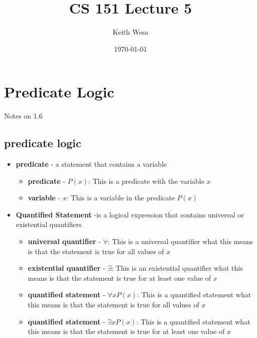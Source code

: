 \documentclass{article}
\author{Keith Wesa} %
\title{CS 151 Lecture 5} %
\date{\today} %
\begin{document}

\section{Predicate Logic}{Notes on 1.6}
\subsection{predicate logic}
\begin{itemize}
    \item[] \textbf{predicate} - a statement that contains a variable
    \begin{itemize}
        \item[] \textbf{predicate} - $P(x)$: This is a predicate with the variable $x$
        \item[] \textbf{variable} - $x$: This is a variable in the predicate $P(x)$
    \end{itemize}
    \item[] \textbf{Quantified Statement} -is a logical expression that contains universal or existential quantifiers 
    \begin{itemize}
        \item[] \textbf{universal quantifier} - $\forall$: This is a universal quantifier
        what this means is that the statement is true for all values of $x$
        \item[] \textbf{existential quantifier} - $\exists$: This is an existential quantifier
        what this means is that the statement is true for at least one value of $x$
        \item[] \textbf{quantified statement} - $\forall x P(x)$: This is a quantified statement
        what this means is that the statement is true for all values of $x$
        \item[] \textbf{quantified statement} - $\exists x P(x)$: This is a quantified statement
        what this means is that the statement is true for at least one value of $x$
    \end{itemize}
\end{itemize}
\end{document}
